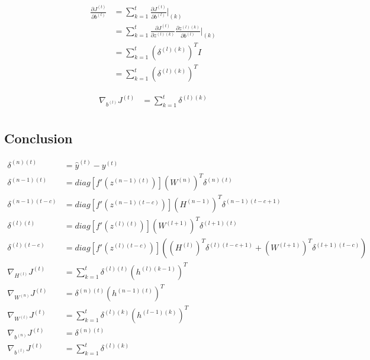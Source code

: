 \documentclass{article}
\begin{document}
	\begin{equation}
	\begin{aligned}
		\frac{\partial J^{(t)}}{\partial b^{(l)}} &= \sum_{k=1}^{t} \frac{\partial J^{(t)}}{\partial b^{(l)}}\bigg|_{(k)}  \\
		&= \sum_{k=1}^{t}
		\frac{\partial J^{(t)}}{\partial z^{(l)(k)}} 
		\frac{\partial z^{(l)(k)}}{\partial b^{(l)}}\bigg|_{(k)} \\
		&= \sum_{k=1}^{t}
		(\delta^{(l)(k)})^T I \\
		&= \sum_{k=1}^{t} (\delta^{(l)(k)})^T
	\end{aligned}
	\end{equation}
	
	\begin{equation}
	\begin{aligned}
		\nabla_{b^{(l)}} J^{(t)} &= \sum_{k=1}^{t} \delta^{(l)(k)} \\
	\end{aligned}
	\end{equation}	
	
	\subsection{Conclusion}
	\begin{align}
		\delta^{(n)(t)} &= \hat{y}^{(t)} - y^{(t)} \\
		\delta^{(n-1)(t)} &= diag[f'(z^{(n-1)(t)})] (W^{(n)})^T \delta^{(n)(t)} \\
		\delta^{(n-1)(t-c)} &= diag[f'(z^{(n-1)(t-c)})] (H^{(n-1)})^T \delta^{(n-1)(t-c+1)} \\
		\delta^{(l)(t)} &= diag[f'(z^{(l)(t)})] (W^{(l+1)})^T \delta^{(l+1)(t)} \\
		\delta^{(l)(t-c)} &= diag[f'(z^{(l)(t-c)})] ((H^{(l)})^T \delta^{(l)(t-c+1)} + (W^{(l+1)})^T \delta^{(l+1)(t-c)}) \\
		\nabla_{H^{(l)}} J^{(t)} &= \sum_{k=1}^{t} \delta^{(l)(t)} (h^{(l)(k-1)})^T \\
		\nabla_{W^{(n)}} J^{(t)} &= \delta^{(n)(t)} (h^{(n-1)(t)})^T \\
		\nabla_{W^{(l)}} J^{(t)} &= \sum_{k=1}^{t} \delta^{(l)(k)} (h^{(l-1)(k)})^T \\
		\nabla_{b^{(n)}} J^{(t)} &= \delta^{(n)(t)} \\
		\nabla_{b^{(l)}} J^{(t)} &= \sum_{k=1}^{t} \delta^{(l)(k)}
	\end{align}
	
	\newpage
\end{document}
